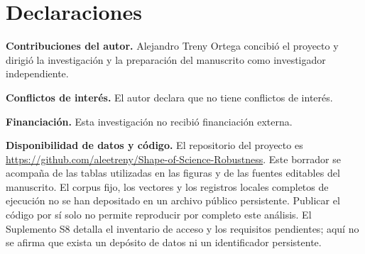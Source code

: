 \documentclass[12pt]{article}
\begin{document}
\section*{Declaraciones}
\textbf{Contribuciones del autor.}
Alejandro Treny Ortega concibió el proyecto y dirigió la investigación y la preparación del manuscrito como investigador independiente.
\par\medskip
\textbf{Conflictos de interés.}
El autor declara que no tiene conflictos de interés.
\par\medskip
\textbf{Financiación.}
Esta investigación no recibió financiación externa.
\par\medskip
\textbf{Disponibilidad de datos y código.}
El repositorio del proyecto es \url{https://github.com/aleetreny/Shape-of-Science-Robustness}. Este borrador se acompaña de las tablas utilizadas en las figuras y de las fuentes editables del manuscrito. El corpus fijo, los vectores y los registros locales completos de ejecución no se han depositado en un archivo público persistente. Publicar el código por sí solo no permite reproducir por completo este análisis. El Suplemento S8 detalla el inventario de acceso y los requisitos pendientes; aquí no se afirma que exista un depósito de datos ni un identificador persistente.


\begingroup
{}


\endgroup
\end{document}
